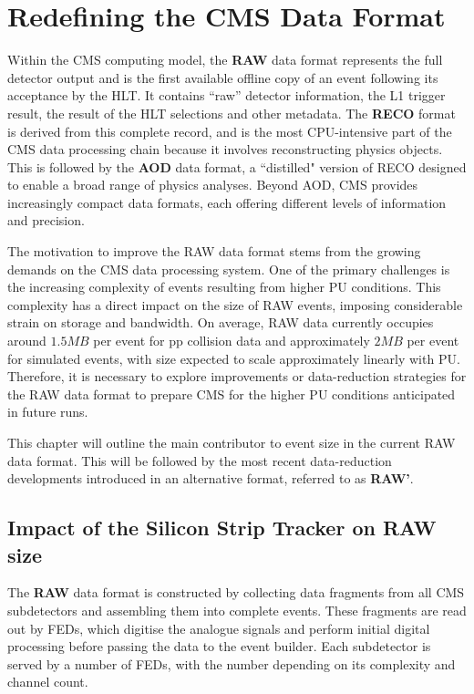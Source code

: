 \chapter{Redefining the CMS Data Format}
\thispagestyle{plain}  %
\pagestyle{chapterpages}
\label{Section:Chapter5}
\minitoc

Within the \ac{CMS} computing model, the \textbf{RAW} data format represents the full detector output and is the first available offline copy of an event following its acceptance by the \ac{HLT}. It contains ``raw'' detector information, the \ac{L1} trigger result, the result of the \ac{HLT} selections and other metadata.  The \textbf{RECO} format is derived from this complete record, and is the most CPU-intensive part of the \ac{CMS} data processing chain because it involves reconstructing physics objects. This is followed by the \textbf{AOD} data format, a ``distilled" version of RECO designed to enable a broad range of physics analyses. Beyond AOD, \ac{CMS} provides increasingly compact data formats, each offering different levels of information and precision.

The motivation to improve the RAW data format stems from the growing demands on the \ac{CMS} data processing system. One of the primary challenges is the increasing complexity of events resulting from higher \ac{PU} conditions. This complexity has a direct impact on the size of RAW events, imposing considerable strain on storage and bandwidth.  On average, RAW data currently occupies around $1.5\unit{MB}$ per event for pp collision data and approximately $2\unit{MB}$ per event for simulated events, with size expected to scale approximately linearly with \ac{PU}. Therefore, it is necessary to explore improvements or data-reduction strategies for the RAW data format to prepare \ac{CMS} for the higher \ac{PU} conditions anticipated in future runs. 

This chapter will outline the main contributor to event size in the current RAW data format. This will be followed by the most recent data-reduction developments introduced in an alternative format, referred to as \textbf{RAW'}.

\section{Impact of the Silicon Strip Tracker on RAW size}
The \textbf{RAW} data format is constructed by collecting data fragments from all \ac{CMS} subdetectors and assembling them into complete events. These fragments are read out by \acp{FED}, which digitise the analogue signals and perform initial digital processing before passing the data to the event builder. Each subdetector is served by a number of \acp{FED}, with the number depending on its complexity and channel count.

